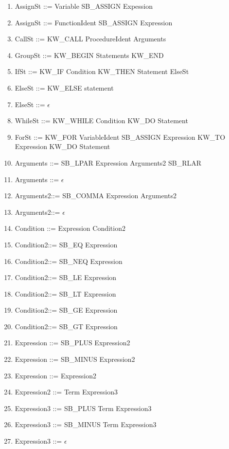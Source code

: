 \documentclass[12pt, a4paper]{report}
\begin{document}
\begin{enumerate}
					\item AssignSt ::= Variable SB\_ASSIGN Expession
					\item AssignSt ::= FunctionIdent SB\_ASSIGN Expression

					\item CallSt   ::= KW\_CALL ProcedureIdent Arguments
					\item GroupSt  ::= KW\_BEGIN Statements KW\_END
					\item IfSt     ::= KW\_IF Condition KW\_THEN Statement ElseSt
					\item ElseSt   ::= KW\_ELSE statement
					\item ElseSt   ::= $\epsilon$
					\item WhileSt  ::= KW\_WHILE Condition KW\_DO Statement
					\item ForSt    ::= KW\_FOR VariableIdent SB\_ASSIGN Expression KW\_TO Expression KW\_DO Statement

					\item Arguments ::= SB\_LPAR Expression Arguments2 SB\_RLAR
					\item Arguments ::= $\epsilon$
					\item Arguments2::= SB\_COMMA Expression Arguments2
					\item Arguments2::= $\epsilon$

					\item Condition ::= Expression Condition2
					\item Condition2::= SB\_EQ Expression
					\item Condition2::= SB\_NEQ Expression
					\item Condition2::= SB\_LE Expression
					\item Condition2::= SB\_LT Expression
					\item Condition2::= SB\_GE Expression
					\item Condition2::= SB\_GT Expression   
					
					\item Expression ::= SB\_PLUS Expression2
					\item Expression ::= SB\_MINUS Expression2
					\item Expression ::= Expression2
					\item Expression2 ::= Term Expression3
					\item Expression3 ::= SB\_PLUS Term Expression3
					\item Expression3 ::= SB\_MINUS Term Expression3
					\item Expression3 ::= $\epsilon$
					

\end{enumerate}
\end{document}
